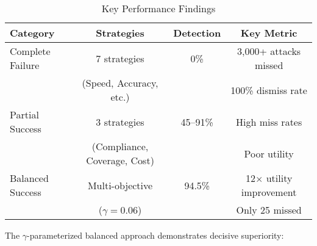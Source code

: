 \documentclass[10pt,conference]{IEEEtran}
\begin{document}
\begin{table}[!h]
\centering
\caption{Key Performance Findings}
\footnotesize
\begin{tabular}{@{}lccc@{}}
\toprule
\textbf{Category} & \textbf{Strategies} & \textbf{Detection} & \textbf{Key Metric} \\
\midrule
\rowcolor{ieeered!10}
Complete Failure & 7 strategies & 0\% & 3,000+ attacks missed \\
& (Speed, Accuracy, etc.) & & 100\% dismiss rate \\
\midrule
\rowcolor{ieeeorange!10}
Partial Success & 3 strategies & 45--91\% & High miss rates \\
& (Compliance, Coverage, Cost) & & Poor utility \\
\midrule
\rowcolor{ieeegreen!10}
Balanced Success & Multi-objective & 94.5\% & 12$\times$ utility improvement \\
& ($\gamma=0.06$) & & Only 25 missed \\
\bottomrule
\end{tabular}
\end{table}

The $\gamma$-parameterized balanced approach demonstrates decisive superiority:
\end{document}
